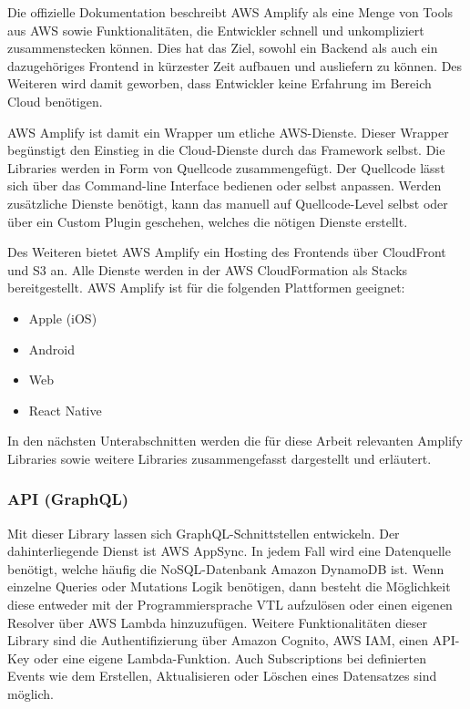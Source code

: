 Die offizielle Dokumentation beschreibt \ac{AWS} Amplify als eine Menge von Tools aus \ac{AWS} sowie Funktionalitäten, die Entwickler schnell und unkompliziert zusammenstecken können. Dies hat das Ziel, sowohl ein Backend als auch ein dazugehöriges Frontend in kürzester Zeit aufbauen und ausliefern zu können. Des Weiteren wird damit geworben, dass Entwickler keine Erfahrung im Bereich Cloud benötigen.

\ac{AWS} Amplify ist damit ein Wrapper um etliche \ac{AWS}-Dienste. Dieser Wrapper begünstigt den Einstieg in die Cloud-Dienste durch das Framework selbst. Die Libraries werden in Form von Quellcode zusammengefügt. Der Quellcode lässt sich über das Command-line Interface bedienen oder selbst anpassen. Werden zusätzliche Dienste benötigt, kann das manuell auf Quellcode-Level selbst oder über ein Custom Plugin geschehen, welches die nötigen Dienste erstellt.

Des Weiteren bietet \ac{AWS} Amplify ein Hosting des Frontends über CloudFront und S3 an. Alle Dienste werden in der \ac{AWS} CloudFormation als Stacks bereitgestellt. \ac{AWS} Amplify ist für die folgenden Plattformen geeignet:
\begin{itemize}
  \item Apple (iOS)
  \item Android
  \item Web
  \item React Native
\end{itemize}

In den nächsten Unterabschnitten werden die für diese Arbeit relevanten Amplify Libraries sowie weitere Libraries zusammengefasst dargestellt und erläutert.

\subsubsection{API (GraphQL)}

Mit dieser Library lassen sich GraphQL-Schnittstellen entwickeln. Der dahinterliegende Dienst ist \ac{AWS} AppSync. In jedem Fall wird eine Datenquelle benötigt, welche häufig die NoSQL-Datenbank Amazon DynamoDB ist. Wenn einzelne Queries oder Mutations Logik benötigen, dann besteht die Möglichkeit diese entweder mit der Programmiersprache VTL aufzulösen oder einen eigenen Resolver über \ac{AWS} Lambda hinzuzufügen. Weitere Funktionalitäten dieser Library sind die Authentifizierung über Amazon Cognito, \ac{AWS} IAM, einen API-Key oder eine eigene Lambda-Funktion. Auch Subscriptions bei definierten Events wie dem Erstellen, Aktualisieren oder Löschen eines Datensatzes sind möglich.

